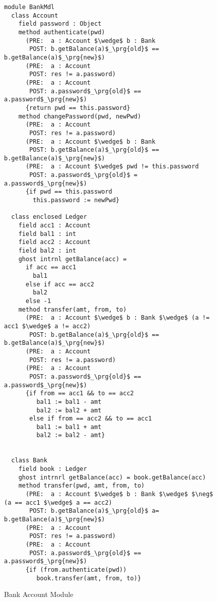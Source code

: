 \begin{figure}[t]
\begin{lstlisting}[mathescape=true, frame=lines, language=chainmail]
module BankMdl
  class Account
    field password : Object
    method authenticate(pwd)
      (PRE:  a : Account $\wedge$ b : Bank
       POST: b.getBalance(a)$_\prg{old}$ == b.getBalance(a)$_\prg{new}$)
      (PRE:  a : Account
       POST: res != a.password)
      (PRE:  a : Account
       POST: a.password$_\prg{old}$ == a.password$_\prg{new}$)
      {return pwd == this.password}
    method changePassword(pwd, newPwd)
      (PRE:  a : Account
       POST: res != a.password)
      (PRE:  a : Account $\wedge$ b : Bank
       POST: b.getBalance(a)$_\prg{old}$ == b.getBalance(a)$_\prg{new}$)
      (PRE:  a : Account $\wedge$ pwd != this.password
       POST: a.password$_\prg{old}$ = a.password$_\prg{new}$)
      {if pwd == this.password
        this.password := newPwd}

  class enclosed Ledger
    field acc1 : Account
    field bal1 : int
    field acc2 : Account
    field bal2 : int
    ghost intrnl getBalance(acc) = 
      if acc == acc1
        bal1
      else if acc == acc2
        bal2
      else -1
    method transfer(amt, from, to)
      (PRE:  a : Account $\wedge$ b : Bank $\wedge$ (a != acc1 $\wedge$ a != acc2)
       POST: b.getBalance(a)$_\prg{old}$ == b.getBalance(a)$_\prg{new}$)
      (PRE:  a : Account
       POST: res != a.password)
      (PRE:  a : Account
       POST: a.password$_\prg{old}$ == a.password$_\prg{new}$)
      {if from == acc1 && to == acc2
         bal1 := bal1 - amt
         bal2 := bal2 + amt
       else if from == acc2 && to == acc1
         bal1 := bal1 + amt
         bal2 := bal2 - amt}
      

  class Bank
    field book : Ledger
    ghost intrnrl getBalance(acc) = book.getBalance(acc)
    method transfer(pwd, amt, from, to)
      (PRE:  a : Account $\wedge$ b : Bank $\wedge$ $\neg$ (a == acc1 $\wedge$ a == acc2)
       POST: b.getBalance(a)$_\prg{old}$ a= b.getBalance(a)$_\prg{new}$)
      (PRE:  a : Account
       POST: res != a.password)
      (PRE:  a : Account
       POST: a.password$_\prg{old}$ == a.password$_\prg{new}$)
      {if (from.authenticate(pwd))
         book.transfer(amt, from, to)}
\end{lstlisting}
\caption{Bank Account Module}
\label{f:ex-bank}
\end{figure}
